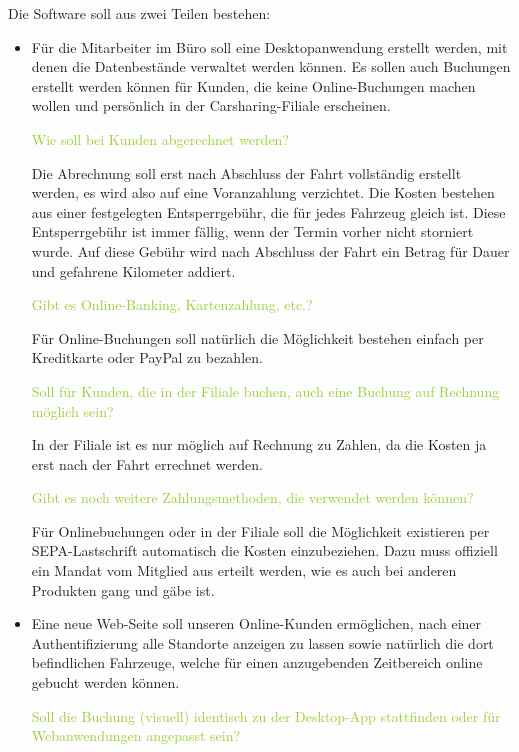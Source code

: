 Die Software soll aus zwei Teilen bestehen:  

\begin{itemize}
    \item Für die Mitarbeiter im Büro soll eine Desktopanwendung erstellt werden, mit denen die Datenbestände verwaltet werden können. Es sollen auch Buchungen erstellt werden können für Kunden, die keine Online-Buchungen machen wollen und persönlich in der Carsharing-Filiale erscheinen. 

    \textcolor{YellowGreen}{Wie soll bei Kunden abgerechnet werden?}

    \textcolor{NavyBlue}{Die Abrechnung soll erst nach Abschluss der Fahrt vollständig erstellt werden, es wird also auf eine Voranzahlung verzichtet. Die Kosten bestehen aus einer festgelegten Entsperrgebühr, die für jedes Fahrzeug gleich ist. Diese Entsperrgebühr ist immer fällig, wenn der Termin vorher nicht storniert wurde. Auf diese Gebühr wird nach Abschluss der Fahrt ein Betrag für Dauer und gefahrene Kilometer addiert.}

    \textcolor{YellowGreen}{Gibt es Online-Banking, Kartenzahlung, etc.?}

    \textcolor{NavyBlue}{Für Online-Buchungen soll natürlich die Möglichkeit bestehen einfach per Kreditkarte oder PayPal zu bezahlen.}

    \textcolor{YellowGreen}{Soll für Kunden, die in der Filiale buchen, auch eine Buchung auf Rechnung möglich sein?}

    \textcolor{NavyBlue}{ In der Filiale ist es nur möglich auf Rechnung zu Zahlen, da die Kosten ja erst nach der Fahrt errechnet werden. }

    \textcolor{YellowGreen}{Gibt es noch weitere Zahlungsmethoden, die verwendet werden können?}

    \textcolor{NavyBlue}{Für Onlinebuchungen oder in der Filiale soll die Möglichkeit existieren per SEPA-Lastschrift automatisch die Kosten einzubeziehen. Dazu muss offiziell ein Mandat vom Mitglied aus erteilt werden, wie es auch bei anderen Produkten gang und gäbe ist.}

    \item Eine neue Web-Seite soll unseren Online-Kunden ermöglichen, nach einer Authentifizierung alle Standorte anzeigen zu lassen sowie natürlich die dort befindlichen Fahrzeuge, welche für einen anzugebenden Zeitbereich online gebucht werden können. 
    
    \textcolor{YellowGreen}{Soll die Buchung (visuell) identisch zu der Desktop-App stattfinden oder für Webanwendungen angepasst sein?}


\end{itemize}
